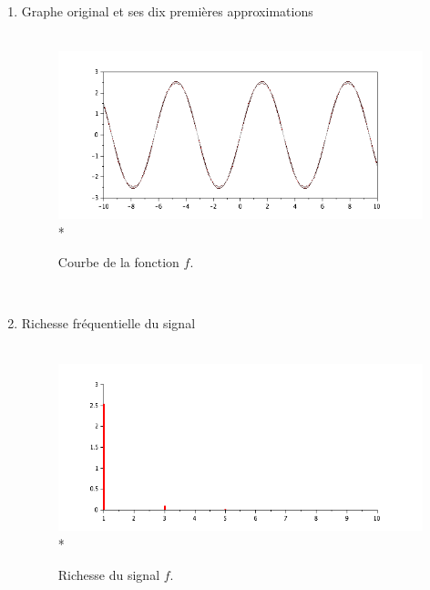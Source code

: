 \documentclass[a4paper,12pt]{report}
\begin{document}
\begin{enumerate}
\begin{enumerate}
			\item Graphe original et ses dix premières approximations \\ \\
			\begin{figure}[h!]
				\centering
				\includegraphics[scale=0.6]{ex1_fig5_1.png}\\*
				\caption{\label{ex1_figure5_1}Courbe de la fonction $f$.}
			\end{figure}\\
		
			\item Richesse fréquentielle du signal \\ \\
			\begin{figure}[h!]
				\centering
				\includegraphics[scale=0.6]{ex1_fig5_2.png}\\*
				\caption{\label{ex1_figure5_2}Richesse du signal $f$.}
			\end{figure}\\
		\end{enumerate}

		
	\end{enumerate}
\newpage



	

\end{document}
